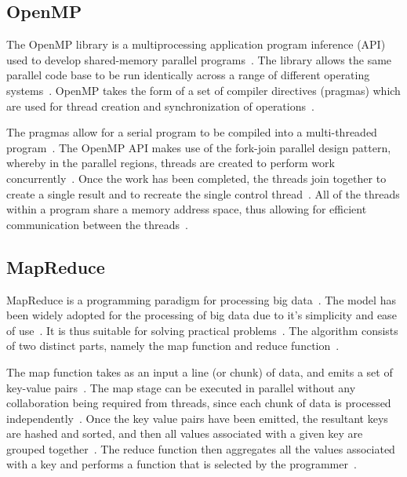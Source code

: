 \documentclass[11pt,twocolumn]{witseiepaper}
\begin{document}
\subsection{OpenMP}

The OpenMP library is a multiprocessing application program inference (API) used to develop shared-memory parallel programs~\cite{comparingMPIMapReduce}. The library allows the same parallel code base to be run identically across a range of different operating systems~\cite{comparingMPIMapReduce}. OpenMP takes the form of a set of compiler directives (pragmas) which are used for thread creation and synchronization of operations~\cite{comparingMPIMapReduce}. 

The pragmas allow for a serial program to be compiled into a multi-threaded program~\cite{kuhn2000openmp}. The OpenMP API makes use of the fork-join parallel design pattern, whereby in the parallel regions, threads are created to perform work concurrently~\cite{openMP}. Once the work has been completed, the threads join together to create a single result and to recreate the single control thread~\cite{openMP}. All of the threads within a program share a memory address space, thus allowing for efficient communication between the threads~\cite{comparingMPIMapReduce}. 

\subsection{MapReduce}

MapReduce is a programming paradigm for processing big data~\cite{comparingMPIMapReduce}. The model has been widely adopted for the processing of big data due to it's simplicity and ease of use~\cite{comparingMPIMapReduce}. It is thus suitable for solving practical problems~\cite{comparingMPIMapReduce, mapReduceJoin}. The algorithm consists of two distinct parts, namely the map function and reduce function~\cite{phoenix}. 

The map function takes as an input a line (or chunk) of data, and emits a set of key-value pairs~\cite{phoenix}. The map stage can be executed in parallel without any collaboration being required from threads, since each chunk of data is processed independently~\cite{comparingMPIMapReduce}. Once the key value pairs have been emitted, the resultant keys are hashed and sorted, and then all values associated with a given key are grouped together~\cite{phoenix}. The reduce function then aggregates all the values associated with a key and performs a function that is selected by the programmer~\cite{comparingMPIMapReduce}.
\end{document}
